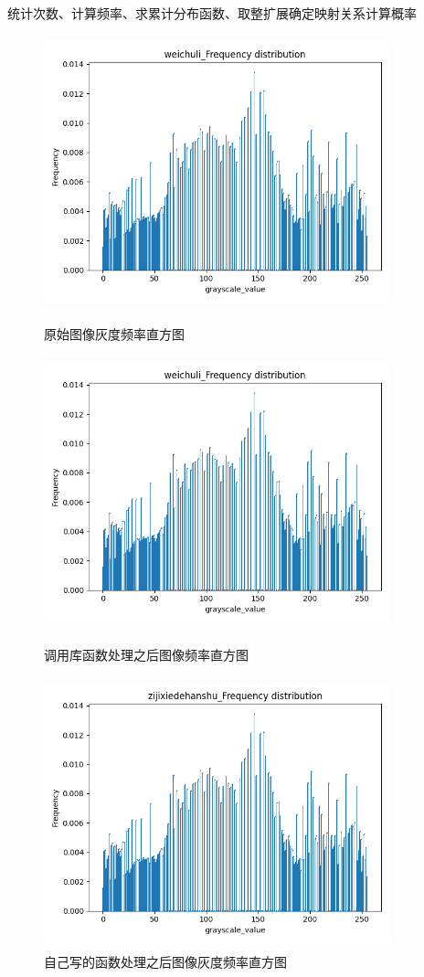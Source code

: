 \documentclass{article}
\begin{document}
   统计次数、计算频率、求累计分布函数、取整扩展确定映射关系计算概率
   \begin{figure}[h!]
                \centering
                \includegraphics[width=10cm,height=7.9cm]{xuan6.png}
                \caption{原始图像灰度频率直方图}
                \includegraphics[width=10cm,height=7.9cm]{xuan6.png}
                \caption{调用库函数处理之后图像频率直方图}
                \includegraphics[width=10cm,height=7.9cm]{xuan7.png}
                \caption{自己写的函数处理之后图像灰度频率直方图}
                \end{figure}
\clearpage
\newpage
\end{document}
